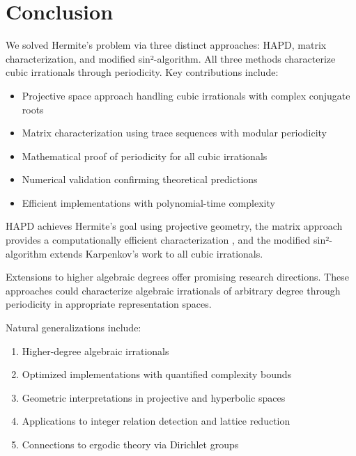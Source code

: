 \section{Conclusion}\label{sec:conclusion}

We solved Hermite's problem via three distinct approaches: HAPD, matrix characterization, and modified sin²-algorithm. All three methods characterize cubic irrationals through periodicity. Key contributions include:

\begin{itemize}
\item Projective space approach handling cubic irrationals with complex conjugate roots
\item Matrix characterization using trace sequences with modular periodicity 
\item Mathematical proof of periodicity for all cubic irrationals
\item Numerical validation confirming theoretical predictions
\item Efficient implementations with polynomial-time complexity
\end{itemize}

HAPD achieves Hermite's goal \cite{Hermite1848} using projective geometry, the matrix approach provides a computationally efficient characterization \cite{Horn2012, Cohen1993}, and the modified sin²-algorithm extends Karpenkov's work \cite{Karpenkov2019, Karpenkov2022} to all cubic irrationals.

Extensions to higher algebraic degrees offer promising research directions. These approaches could characterize algebraic irrationals of arbitrary degree through periodicity in appropriate representation spaces.

Natural generalizations include:
\begin{enumerate}
\item Higher-degree algebraic irrationals \cite{Karpenkov2024}
\item Optimized implementations with quantified complexity bounds \cite{Ferguson1999}
\item Geometric interpretations in projective and hyperbolic spaces \cite{KarpenkovBook}
\item Applications to integer relation detection \cite{Ferguson1999} and lattice reduction \cite{Lenstra1982}
\item Connections to ergodic theory via Dirichlet groups \cite{Karpenkov2022}
\end{enumerate}
